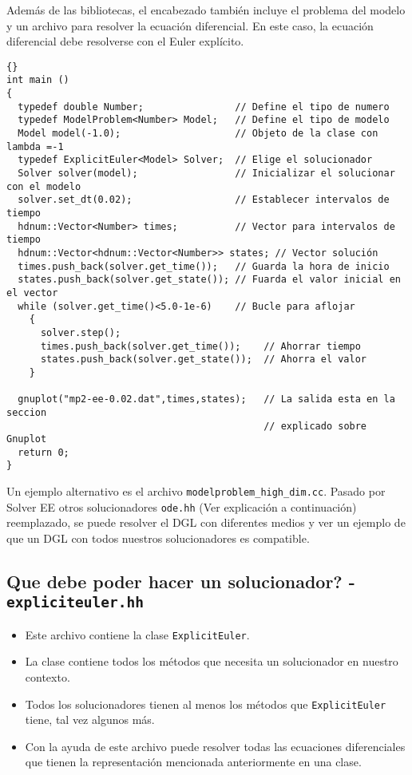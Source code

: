 \documentclass[a4paper,11pt]{article}
\theoremstyle{definition}
\begin{document}
Además de las bibliotecas, el encabezado también incluye el problema del modelo y un archivo para resolver la ecuación diferencial. En este caso, la ecuación diferencial debe resolverse con el Euler explícito.

{\footnotesize{\begin{lstlisting}{}
int main ()
{
  typedef double Number;                // Define el tipo de numero
  typedef ModelProblem<Number> Model;   // Define el tipo de modelo
  Model model(-1.0);                    // Objeto de la clase con lambda =-1
  typedef ExplicitEuler<Model> Solver;  // Elige el solucionador
  Solver solver(model);                 // Inicializar el solucionar con el modelo
  solver.set_dt(0.02);                  // Establecer intervalos de tiempo
  hdnum::Vector<Number> times;          // Vector para intervalos de tiempo
  hdnum::Vector<hdnum::Vector<Number>> states; // Vector solución
  times.push_back(solver.get_time());   // Guarda la hora de inicio
  states.push_back(solver.get_state()); // Fuarda el valor inicial en el vector
  while (solver.get_time()<5.0-1e-6)    // Bucle para aflojar
    {
      solver.step();
      times.push_back(solver.get_time());    // Ahorrar tiempo
      states.push_back(solver.get_state());  // Ahorra el valor
    }

  gnuplot("mp2-ee-0.02.dat",times,states);   // La salida esta en la seccion
                                             // explicado sobre Gnuplot 
  return 0;
}
\end{lstlisting}}}

Un ejemplo alternativo es el archivo 
\lstinline{modelproblem_high_dim.cc}. Pasado por Solver EE otros solucionadores \lstinline{ode.hh} (Ver explicación a continuación) reemplazado,
se puede resolver el DGL con diferentes medios y ver un ejemplo de que un DGL con todos nuestros solucionadores es compatible. 

\subsection{Que debe poder hacer un solucionador? - \lstinline{expliciteuler.hh}}
\begin{itemize}
\item Este archivo contiene la clase \lstinline{ExplicitEuler}.
\item La clase contiene todos los métodos que necesita un solucionador en nuestro contexto.
\item Todos los solucionadores tienen al menos los métodos que 
  \lstinline{ExplicitEuler} tiene, tal vez algunos más.
\item Con la ayuda de este archivo puede resolver todas las ecuaciones diferenciales que tienen la representación mencionada anteriormente en una clase.
\end{itemize}
\end{document}

